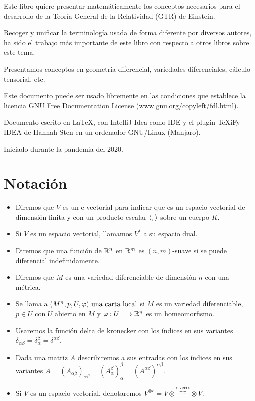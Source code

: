 Este libro quiere presentar matemáticamente los conceptos necesarios para el desarrollo de la Teoría General de la
Relatividad (GTR) de Einstein.

Recoger y unificar la terminología usada de forma diferente por diversos autores, ha sido el trabajo más importante
de este libro con respecto a otros libros sobre este tema.

Presentamos conceptos en geometría diferencial, variedades diferenciales, cálculo tensorial, etc.

Este documento puede ser usado libremente en las condiciones que establece la licencia GNU Free Documentation License
(www.gnu.org/copyleft/fdl.html).

Documento escrito en \LaTeX, con IntelliJ Idea como IDE y el plugin TeXiFy IDEA
de Hannah-Sten en un ordenador GNU/Linux (Manjaro).

Iniciado durante la pandemia del 2020.

\section{Notaci\'on}\label{ch:notacion}
\begin{itemize}
  \item Diremos que $V$ es un e-vectorial para indicar que es un espacio vectorial
  de dimensión finita y con un producto escalar $\langle , \rangle$ sobre un cuerpo $K$.
  \item Si $V$ es un espacio vectorial, llamamos $V^*$ a su espacio dual.
  \item Diremos que una función de $\mathbb{R}^n$ en $\mathbb{R}^m$ es $(n,m)$-suave si se puede diferencial indefinidamente.
  \item Diremos que $M$ es una variedad diferenciable de dimensión $n$ con una métrica.
  \item Se llama a $(M^n,p,U,\varphi)\textmd{ una carta local}$ si $M$ es un variedad diferenciable, $p\in U$ con $U$ abierto en $M$ y $\varphi:U\longrightarrow \mathbb{R}^n$ es un homeomorfismo.
  \item Usaremos la función delta de kronecker con los índices en sus variantes
  $\delta_{\alpha\beta}=\delta_\alpha^\beta=\delta^{\alpha\beta}$.
  \item Dada una matriz $A$ describiremos a sus entradas con los índices en sus variantes
  $A=(A_{\alpha\beta})_{\alpha\beta}=(A_\alpha^\beta)_\alpha^\beta=(A^{\alpha\beta})^{\alpha\beta}$.
  \item Si $V$ es un espacio vectorial, denotaremos
  $V^{\otimes r}=V\otimes\overbrace{\cdots}^\text{r\ veces}\otimes V$.
\end{itemize}

